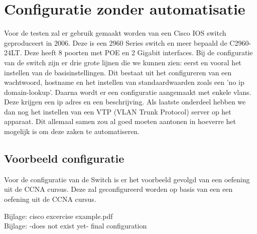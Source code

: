 
\chapter{Configuratie zonder automatisatie}
\label{ch:configuratie}

Voor de testen zal er gebruik gemaakt worden van een Cisco IOS switch geproduceert in 2006. Deze is een 2960 Series switch en meer bepaald de C2960-24LT. Deze heeft 8 poorten met POE en 2 Gigabit interfaces. Bij de configuratie van de switch zijn er drie grote lijnen die we kunnen zien: eerst en vooral het instellen van de basisinstellingen. Dit bestaat uit het configureren van een wachtwoord, hostname en het instellen van standaardwaarden zoals een 'no ip domain-lookup'.
Daarna wordt er een configuratie aangemaakt met enkele vlans. Deze krijgen een ip adres en een beschrijving. Als laatste onderdeel hebben we dan nog het instellen van een VTP (VLAN Trunk Protocol) server op het apparaat. Dit allemaal samen zou al goed moeten aantonen in hoeverre het mogelijk is om deze zaken te automatiseren.

\section{Voorbeeld configuratie}
\label{sec:voorbeeld}
Voor de configuratie van de Switch is er het voorbeeld gevolgd van een oefening uit de CCNA cursus. 
Deze zal geconfigureerd worden op basis van een een oefening uit de CCNA cursus.

Bijlage: cisco excercise example.pdf\\
Bijlage: -does not exist yet- final configuration

